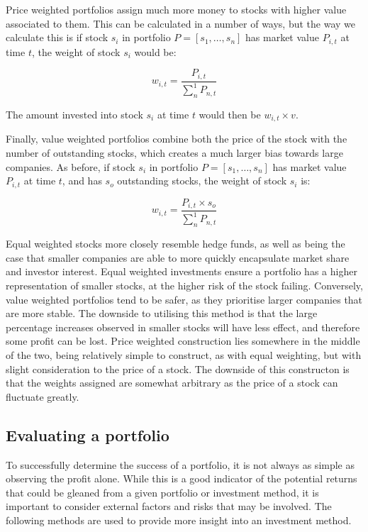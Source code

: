 Price weighted portfolios assign much more money to stocks with higher value associated to them. This can be calculated in a number of ways, but the way we calculate this is if stock $s_i$ in portfolio $P = [s_1, \dots, s_n]$ has market value $P_{i,t}$ at time $t$, the weight of stock $s_i$ would be:

\begin{equation}
w_{i,t} = \frac{P_{i,t}}{\sum_{n}^1 P_{n,t}}
\end{equation}

\noindent
The amount invested into stock $s_i$ at time $t$ would then be $w_{i,t} \times v$.

Finally, value weighted portfolios combine both the price of the stock with the number of outstanding stocks, which creates a much larger bias towards large companies. As before, if stock $s_i$ in portfolio $P=[s_1, \dots, s_n]$ has market value $P_{i,t}$ at time $t$, and has $s_o$ outstanding stocks, the weight of stock $s_i$ is:

\begin{equation}
w_{i,t} = \frac{P_{i,t} \times s_o}{\sum_{n}^1 P_{n,t}}
\end{equation}

Equal weighted stocks more closely resemble hedge funds, as well as being the case that smaller companies are able to more quickly encapsulate market share and investor interest. Equal weighted investments ensure a portfolio has a higher representation of smaller stocks, at the higher risk of the stock failing. Conversely, value weighted portfolios tend to be safer, as they prioritise larger companies that are more stable. The downside to utilising this method is that the large percentage increases observed in smaller stocks will have less effect, and therefore some profit can be lost. Price weighted construction lies somewhere in the middle of the two, being relatively simple to construct, as with equal weighting, but with slight consideration to the price of a stock. The downside of this constructon is that the weights assigned are somewhat arbitrary as the price of a stock can fluctuate greatly.

\subsection{Evaluating a portfolio}
To successfully determine the success of a portfolio, it is not always as simple as observing the profit alone. While this is a good indicator of the potential returns that could be gleaned from a given portfolio or investment method, it is important to consider external factors and risks that may be involved. The following methods are used to provide more insight into an investment method.

